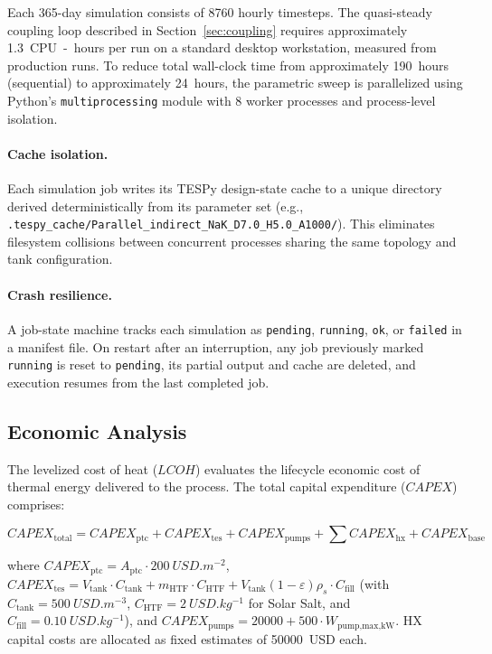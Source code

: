 \documentclass[11pt,review,3p]{elsarticle}
\begin{document}
Each 365-day simulation consists of 8760 hourly timesteps. The quasi-steady coupling loop described in Section~\ref{sec:coupling} requires approximately \SI{1.3}{CPU-hours} per run on a standard desktop workstation, measured from production runs. To reduce total wall-clock time from approximately \SI{190}{hours} (sequential) to approximately \SI{24}{hours}, the parametric sweep is parallelized using Python's \texttt{multiprocessing} module with 8 worker processes and process-level isolation.

\paragraph{Cache isolation.}
Each simulation job writes its TESPy design-state cache to a unique directory derived deterministically from its parameter set (e.g., \texttt{.tespy\_cache/Parallel\_indirect\_NaK\_D7.0\_H5.0\_A1000/}). This eliminates filesystem collisions between concurrent processes sharing the same topology and tank configuration.

\paragraph{Crash resilience.}
A job-state machine tracks each simulation as \texttt{pending}, \texttt{running}, \texttt{ok}, or \texttt{failed} in a manifest file. On restart after an interruption, any job previously marked \texttt{running} is reset to \texttt{pending}, its partial output and cache are deleted, and execution resumes from the last completed job.

\subsection{Economic Analysis}
\label{sec:economics}

The levelized cost of heat ($LCOH$) evaluates the lifecycle economic cost of thermal energy delivered to the process. The total capital expenditure ($CAPEX$) comprises:

\begin{equation}
    CAPEX_{\text{total}} = CAPEX_{\text{ptc}} + CAPEX_{\text{tes}} + CAPEX_{\text{pumps}} + \sum CAPEX_{\text{hx}} + CAPEX_{\text{base}}
    \label{eq:capex}
\end{equation}

where $CAPEX_{\text{ptc}} = A_{\text{ptc}} \cdot \SI{200}{USD.m^{-2}}$, $CAPEX_{\text{tes}} = V_{\text{tank}} \cdot C_{\text{tank}} + m_{\text{HTF}} \cdot C_{\text{HTF}} + V_{\text{tank}}(1-\varepsilon)\rho_s \cdot C_{\text{fill}}$ (with $C_{\text{tank}} = \SI{500}{USD.m^{-3}}$, $C_{\text{HTF}} = \SI{2}{USD.kg^{-1}}$ for Solar Salt, and $C_{\text{fill}} = \SI{0.10}{USD.kg^{-1}}$), and $CAPEX_{\text{pumps}} = 20000 + 500 \cdot W_{\text{pump,max,kW}}$. HX capital costs are allocated as fixed estimates of \SI{50000}{USD} each.
\end{document}
